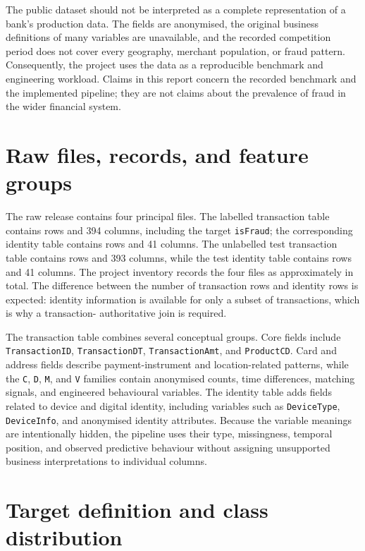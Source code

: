 The public dataset should not be interpreted as a complete representation of a
bank's production data. The fields are anonymised, the original business
definitions of many variables are unavailable, and the recorded competition
period does not cover every geography, merchant population, or fraud pattern.
Consequently, the project uses the data as a reproducible benchmark and
engineering workload. Claims in this report concern the recorded benchmark and
the implemented pipeline; they are not claims about the prevalence of fraud in
the wider financial system.

\section{Raw files, records, and feature groups}

The raw release contains four principal files. The labelled transaction table
contains  rows and 394 columns, including the target
\texttt{isFraud}; the corresponding identity table contains 
rows and 41 columns. The unlabelled test transaction table contains
 rows and 393 columns, while the test identity table contains
 rows and 41 columns. The project inventory records the four files
as approximately  in total. The difference between the number of
transaction rows and identity rows is expected: identity information is
available for only a subset of transactions, which is why a transaction-
authoritative join is required.

The transaction table combines several conceptual groups. Core fields include
\texttt{TransactionID}, \texttt{TransactionDT}, \texttt{TransactionAmt}, and
\texttt{ProductCD}. Card and address fields describe payment-instrument and
location-related patterns, while the \texttt{C}, \texttt{D}, \texttt{M}, and
\texttt{V} families contain anonymised counts, time differences, matching
signals, and engineered behavioural variables. The identity table adds fields
related to device and digital identity, including variables such as
\texttt{DeviceType}, \texttt{DeviceInfo}, and anonymised identity attributes.
Because the variable meanings are intentionally hidden, the pipeline uses
their type, missingness, temporal position, and observed predictive behaviour
without assigning unsupported business interpretations to individual columns.

\section{Target definition and class distribution}

